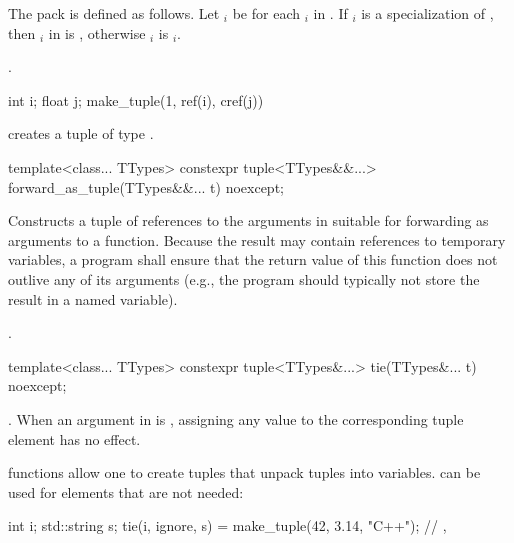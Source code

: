 \begin{itemdescr}
\pnum
The pack  is defined as follows. Let $_i$ be  for each
$_i$ in . If $_i$ is a specialization of
, then $_i$ in  is ,
otherwise $_i$ is $_i$.

\pnum
\returns {}.

\pnum
\begin{example}
\begin{codeblock}
int i; float j;
make_tuple(1, ref(i), cref(j))
\end{codeblock}
creates a tuple of type .
\end{example}
\end{itemdescr}

%
%
\begin{itemdecl}
template<class... TTypes>
  constexpr tuple<TTypes&&...> forward_as_tuple(TTypes&&... t) noexcept;
\end{itemdecl}

\begin{itemdescr}
\pnum
\effects Constructs a tuple of references to the arguments in  suitable
for forwarding as arguments to a function. Because the result may contain references
to temporary variables, a program shall ensure that the return value of this
function does not outlive any of its arguments (e.g., the program should typically
not store the result in a named variable).

\pnum
\returns {}.
\end{itemdescr}

%
%
%
\begin{itemdecl}
template<class... TTypes>
  constexpr tuple<TTypes&...> tie(TTypes&... t) noexcept;
\end{itemdecl}

\begin{itemdescr}
\pnum
\returns {}.  When an
argument in  is , assigning
any value to the corresponding tuple element has no effect.

\pnum
\begin{example}
 functions allow one to create tuples that unpack
tuples into variables.  can be used for elements that
are not needed:
\begin{codeblock}
int i; std::string s;
tie(i, ignore, s) = make_tuple(42, 3.14, "C++");
// , 
\end{codeblock}
\end{example}
\end{itemdescr}

